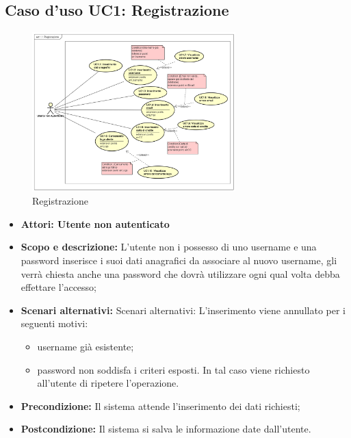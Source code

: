 \documentclass[12pt,a4paper,titlepage]{article}
\begin{document}
\subsection{Caso d'uso UC1: Registrazione}
\begin{figure}[ht]
	\centering
	\includegraphics[width=0.7\textwidth]{UseCase/Registrazione}
	\caption{Registrazione}
\end{figure}
\begin{itemize}
	\item \textbf{Attori: Utente non autenticato}
	\item \textbf{Scopo e descrizione:} L'utente non i possesso di uno username e una password inserisce i suoi dati anagrafici da associare al nuovo username, gli verrà chiesta anche una password che dovrà utilizzare ogni qual volta debba effettare l'accesso;
	\item \textbf{Scenari alternativi:} Scenari alternativi: L'inserimento viene annullato per i seguenti motivi:
	\begin{itemize}
		\item username già esistente;
		\item password non soddisfa i criteri esposti. In tal caso viene richiesto all'utente di ripetere l'operazione.
	\end{itemize}
	\item \textbf{Precondizione:} Il sistema attende l'inserimento dei dati richiesti;
	\item \textbf{Postcondizione:} Il sistema si salva le informazione date dall'utente.
\end{itemize}
\end{document}
